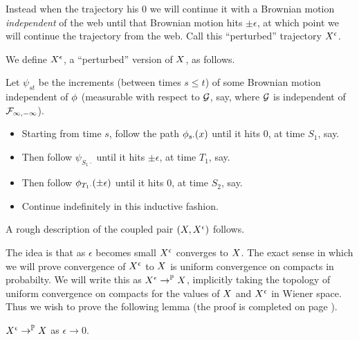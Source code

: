 {Instead when the trajectory his $0$ we will continue it with a
Brownian motion \emph{independent} of the web until that Brownian
motion hits $\pm\epsilon$, at which point we will continue the
trajectory from the web.  Call this ``perturbed'' trajectory
$X^{\epsilon}$.

{
\newcommand{\joinernoargs}{\psi}
\newcommand{\joiner}[2]{\joinernoargs_{{#1}{#2}}}
\begin{definition}
  \label{def:resamplede}
  We define $X^{\epsilon}$, a ``perturbed'' version of $X$, as
  follows.

  Let $\joiner{s}{t}$ be the increments (between times $s \le t$) of
  some Brownian motion independent of $\phi$ (measurable with
  respect to $\mathcal{G}$, say, where $\mathcal{G}$ is independent of
  $\mathcal{F}_{\infty,-\infty}$).

  \begin{itemize}
  \item Starting from time $s$, follow the path $\phi_{{s}{\cdot}}(x)$
    until it hits $0$, at time $S_1$, say.
  \item Then follow $\joiner{S_1}{\cdot}$ until it hits $\pm \epsilon$, at
    time $T_1$, say.
  \item Then follow $\phi_{{T_1}{\cdot}}(\pm \epsilon)$ until it hits $0$, at
    time $S_2$, say.
  \item Continue indefinitely in this inductive fashion.
  \end{itemize}
\end{definition}
}

\begin{obs}
  \label{obs:2d-proc}
  A rough description of the coupled pair $(X, X^{\epsilon})$
  follows.

\end{obs}

The idea is that as $\epsilon$ becomes small $X^{\epsilon}$
converges to $X$.
The exact sense in which we will prove convergence of $X^{\epsilon}$ to
$X$ is uniform convergence on compacts in probabilty.  We will
write this as $X^{\epsilon} \to^{\mathbb{P}} X$, implicitly taking the
topology of uniform convergence on compacts for the values of $X$
and $X^{\epsilon}$ in Wiener space.  Thus we wish to prove the following
lemma (the proof is completed on page
\pageref{proof-of-lem:resamplede-to-sampled}).

\begin{lemma}
  \label{lem:resamplede-to-sampled}
  $X^{\epsilon} \to^{\mathbb{P}} X$ as $\epsilon \to 0$.
\end{lemma}

}
